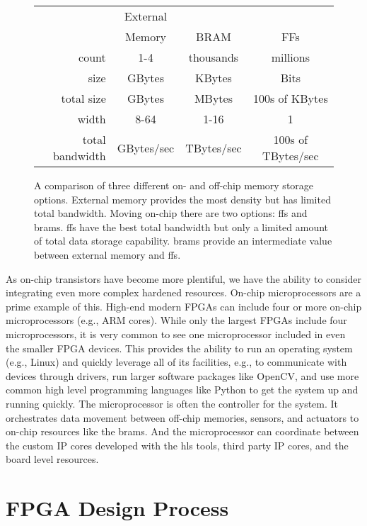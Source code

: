 \begin{figure}
\centering
 
\begin{tabular}{|r|c|c|c|}
\hline
 & External &  & \\
  & Memory & BRAM & FFs \\
\hline
count & 1-4 & thousands & millions \\
size & GBytes & KBytes & Bits \\
total size & GBytes & MBytes & 100s of KBytes \\
width & 8-64 & 1-16 & 1 \\
total bandwidth & GBytes/sec & TBytes/sec & 100s of TBytes/sec \\
\hline
\end{tabular}
\caption{A comparison of three different on- and off-chip memory storage options. External memory provides the most density but has limited total bandwidth. Moving on-chip there are two options: \glspl{ff} and \glspl{bram}. \glspl{ff} have the best total bandwidth but only a limited amount of total data storage capability. \glspl{bram} provide an intermediate value between external memory and \glspl{ff}.}
\label{fig:FPGAmemories}
\end{figure}

As on-chip transistors have become more plentiful, we have the ability to consider integrating even more complex hardened resources. On-chip microprocessors are a prime example of this. High-end modern FPGAs can include four or more on-chip microprocessors (e.g., ARM cores). While only the largest FPGAs include four microprocessors, it is very common to see one microprocessor included in even the smaller FPGA devices. This provides the ability to run an operating system (e.g., Linux) and quickly leverage all of its facilities, e.g., to communicate with devices through drivers, run larger software packages like OpenCV, and use more common high level programming languages like Python to get the system up and running quickly. The microprocessor is often the controller for the system. It orchestrates data movement between off-chip memories, sensors, and actuators  to on-chip resources like the \glspl{bram}. And the microprocessor can coordinate between the custom IP cores developed with the \gls{hls} tools, third party IP cores, and the board level resources.   

\section{FPGA Design Process}

